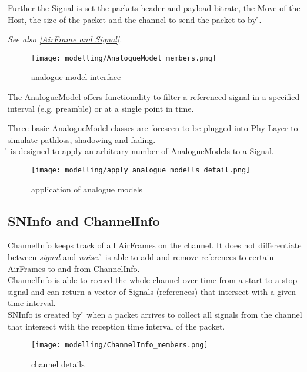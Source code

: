 Further the Signal is set the packets header and payload bitrate,  the Move of the Host, the size of the packet and the channel to send the packet to by \h{\bp}.

\emph{See also \ref{AirFrame and Signal}.}

\begin{figure}[H]
 \centering
 \texttt{[image: modelling/AnalogueModel\_members.png]}
 \caption{analogue model interface}
 \label{fig: analogue model interface}
\end{figure}

The AnalogueModel offers functionality to filter a referenced signal in a specified interval (e.g. preamble) or at a single point in time.

Three basic AnalogueModel classes are foreseen to be plugged into Phy-Layer to simulate pathloss, shadowing and fading.\\
\h{\bp} is designed to apply an arbitrary number of AnalogueModels to a Signal.

\begin{figure}[H]
 \centering
 \texttt{[image: modelling/apply\_analogue\_modells\_detail.png]}%
 \caption{application of analogue models}
 \label{fig: application analogue models}
\end{figure}



\subsection{SNInfo and ChannelInfo}

ChannelInfo keeps track of all AirFrames on the channel. It does not differentiate between \textit{signal} and \textit{noise}. \h{\bp} is able to
add and remove references to certain AirFrames to and from ChannelInfo.\\
ChannelInfo is able to record the whole channel over time from a start to a stop signal and can return a vector of Signals (references) that intersect with a given time interval.\\
SNInfo is created by \h{\bp} when a packet arrives to collect all signals from the channel that intersect with the reception time interval of the packet.

\begin{figure}[H]
 \centering
 \texttt{[image: modelling/ChannelInfo\_members.png]}
 \caption{channel details}
 \label{fig: channel details}
\end{figure}




